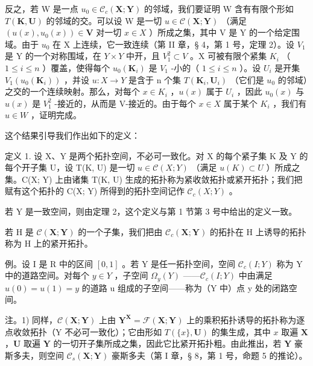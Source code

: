 反之，若 W 是一点 \(u_{0} \in \mathcal{C}_{c}(\mathbf{X}; \mathbf{Y})\) 的邻域，我们要证明 W 含有有限个形如 \(T(\mathbf{K}, \mathbf{U})\) 的邻域的交。可以设 W 是一切 \(u \in \mathcal{C}(\mathbf{X}; \mathbf{Y})\) （满足 \((u(x), u_{0}(x)) \in \mathbf{V}\) 对一切 \(x \in X\) ）所成之集，其中 V 是 Y 的一个给定围域。由于 \(u_{0}\) 在 X 上连续，它一致连续（第 II 章，§ 4，第 1 号，定理 2）。设 \(V_{1}\) 是 Y 的一个对称围域，在 \(Y \times Y\) 中开，且 \(V_{1}^{2} \subset V\) 。X 可被有限个紧集 \(K_{i}\) （ \(1 \leqslant i \leqslant n\) ）覆盖，使得每个 \(u_{0}(\mathbf{K}_{i})\) 是 \(V_{1}\) -小的（ \(1 \leqslant i \leqslant n\) ）。设 \(U_{i}\) 是开集 \(V_{1}(u_{0}(\mathbf{K}_{i}))\) ，并设 \(u: X \to Y\) 是含于 n 个集 \(T(\mathbf{K}_{i}, \mathbf{U}_{i})\) （它们是 \(u_{0}\) 的邻域）之交的一个连续映射。那么，对每个 \(x \in K_{i}\) ，\(u(x)\) 属于 \(U_{i}\) ，因此 \(u_{0}(x)\) 与 \(u(x)\) 是 \(V_{1}^{2}\) -接近的，从而是 V-接近的。由于每个 \(x \in X\) 属于某个 \(K_{i}\) ，我们有 \(u \in W\) ，证明完成。

这个结果引导我们作出如下的定义：

定义 1. 设 X、Y 是两个拓扑空间，不必可一致化。对 X 的每个紧子集 K 及 Y 的每个开子集 U，设 T(K, U) 是一切 \(u \in \mathcal{C}(X; Y)\) （满足 \(u(K) \subset U\) ）所成之集。C(X; Y) 上由诸集 T(K, U) 生成的拓扑称为紧收敛拓扑或紧开拓扑；我们把赋有这个拓扑的 C(X; Y) 所得到的拓扑空间记作 \(\mathcal{C}_{c}(X; Y)\) 。

若 Y 是一致空间，则由定理 2，这个定义与第 1 节第 3 号中给出的定义一致。

若 H 是 \(\mathcal{C}(\mathbf{X};\mathbf{Y})\) 的一个子集，我们把由 \(\mathcal{C}_{c}(\mathbf{X};\mathbf{Y})\) 的拓扑在 H 上诱导的拓扑称为 H 上的紧开拓扑。

例。设 I 是 R 中的区间 \([0, 1]\) 。若 Y 是任一拓扑空间，空间 \(\mathcal{C}_{c}(I; Y)\) 称为 Y 中的道路空间。对每个 \(y \in Y\) ，子空间 \(\Omega_{y}(Y)\) ——\(\mathcal{C}_{c}(I; Y)\) 中由满足 \(u(0) = u(1) = y\) 的道路 u 组成的子空间——称为（Y 中）点 y 处的闭路空间。

注。1) 同样，\(\mathcal{C}(\mathbf{X};\mathbf{Y})\) 上由 \(\mathbf{Y}^{\mathbf{X}} = \mathcal{F}(\mathbf{X};\mathbf{Y})\) 上的乘积拓扑诱导的拓扑称为逐点收敛拓扑（Y 不必可一致化）；它由形如 \(T(\{x\}, \mathbf{U})\) 的集生成，其中 \(x\) 取遍 \(\mathbf{X}\) ，\(\mathbf{U}\) 取遍 \(\mathbf{Y}\) 的一切开子集所成之集，因此它比紧开拓扑粗。由此推出，若 \(\mathbf{Y}\) 豪斯多夫，则空间 \(\mathcal{C}_s(\mathbf{X}; \mathbf{Y})\) 豪斯多夫（第 I 章，§ 8，第 1 号，命题 5 的推论）。

